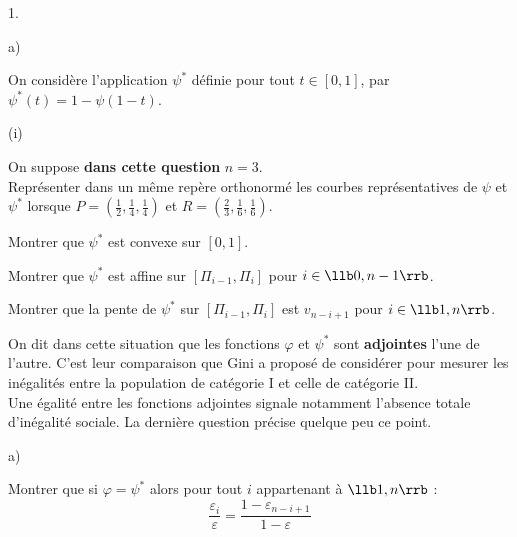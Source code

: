 \documentclass[11pt]{article}%
\begin{document}
\begin{noliste}{1.}
\begin{noliste}{a)}
  
  
  

  
  \item On considère l'application $\psi^*$ définie pour tout $t \in 
  [0,1]$, par $\psi^*(t)= 1-\psi(1-t)$. 
  \begin{nonoliste}{(i)}
   \item On suppose \textbf{dans cette question} $n=3$.\\
   Représenter dans un même repère orthonormé les courbes 
   représentatives de $\psi$ et $\psi^*$ lorsque $P= \left( 
   \frac{1}{2}, \frac{1}{4}, \frac{1}{4} \right)$ et $R=\left( 
   \frac{2}{3}, \frac{1}{6}, \frac{1}{6}  \right)$. 
   
   
   
   \item Montrer que $\psi^*$ est convexe sur $[0,1]$. 
   
   

   
   \item Montrer que $\psi^*$ est affine sur $[\Pi_{i-1}, \Pi_i]$ pour 
   $i \in \llb 0,n-1 \rrb$. 
   
   

   
   \item Montrer que la pente de $\psi^*$ sur $[\Pi_{i-1}, \Pi_i]$ est 
   $v_{n-i+1}$ pour $i \in \llb 1,n \rrb$. 
   
   
  \end{nonoliste}

  \noindent
  On dit dans cette situation que les fonctions $\varphi$ et $\psi^*$ 
  sont \textbf{adjointes} l'une de l'autre. C'est leur comparaison que 
  Gini a proposé de considérer pour \og mesurer les inégalités \fg{} 
  entre la population de catégorie I et celle de catégorie II. \\
  Une égalité entre les fonctions adjointes signale notamment l'absence 
  totale d'inégalité sociale. La dernière question précise quelque peu 
  ce point. 
 \end{noliste}
 
 \item 
 \begin{noliste}{a)}
  \setlength{\itemsep}{2mm}
  \item Montrer que si $\varphi= \psi^*$ alors pour tout $i$ 
  appartenant à $\llb 1,n \rrb$ :
  \[
   \dfrac{\varepsilon_i}{\varepsilon} = 
   \dfrac{1-\varepsilon_{n-i+1}}{1-\varepsilon}
  \]
  
  
  

\end{noliste}
\end{noliste}
\end{document}
